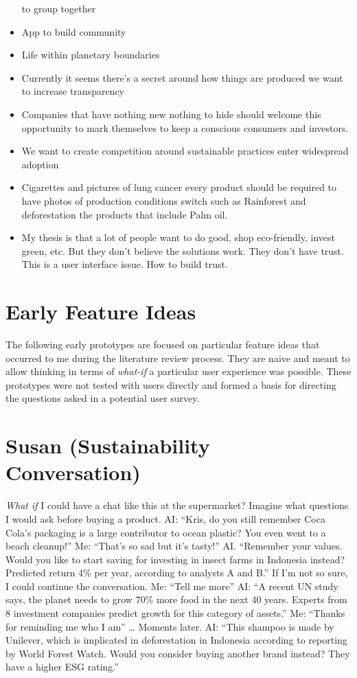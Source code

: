 \documentclass[
  letterpaper,
  DIV=11,
  numbers=noendperiod]{scrartcl}
\begin{document}
\begin{itemize}
  to group together
\item
  App to build community
\item
  Life within planetary boundaries
\item
  Currently it seems there's a secret around how things are produced we
  want to increase transparency
\item
  Companies that have nothing new nothing to hide should welcome this
  opportunity to mark themselves to keep a conscious consumers and
  investors.
\item
  We want to create competition around sustainable practices enter
  widespread adoption
\item
  Cigarettes and pictures of lung cancer every product should be
  required to have photos of production conditions switch such as
  Rainforest and deforestation the products that include Palm oil.
\item
  My thesis is that a lot of people want to do good, shop eco-friendly,
  invest green, etc. But they don't believe the solutions work. They
  don't have trust. This is a user interface issue. How to build trust.
\end{itemize}

\newpage

\section{Early Feature Ideas}\label{early-feature-ideas}

The following early prototypes are focused on particular feature ideas
that occurred to me during the literature review process. They are naive
and meant to allow thinking in terms of \emph{what-if} a particular user
experience was possible. These prototypes were not tested with users
directly and formed a basis for directing the questions asked in a
potential user survey.

\section{Susan (Sustainability
Conversation)}\label{susan-sustainability-conversation}

\emph{What if} I could have a chat like this at the supermarket? Imagine
what questions I would ask before buying a product. AI: ``Kris, do you
still remember Coca Cola's packaging is a large contributor to ocean
plastic? You even went to a beach cleanup!'' Me: ``That's so sad but
it's tasty!'' AI. ``Remember your values. Would you like to start saving
for investing in insect farms in Indonesia instead? Predicted return 4\%
per year, according to analysts A and B.'' If I'm not so sure, I could
continue the conversation. Me: ``Tell me more'' AI: ``A recent UN study
says, the planet needs to grow 70\% more food in the next 40 years.
Experts from 8 investment companies predict growth for this category of
assets.'' Me: ``Thanks for reminding me who I am'' \ldots{} Moments
later. AI: ``This shampoo is made by Unilever, which is implicated in
deforestation in Indonesia according to reporting by World Forest Watch.
Would you consider buying another brand instead? They have a higher ESG
rating.''
\end{document}
